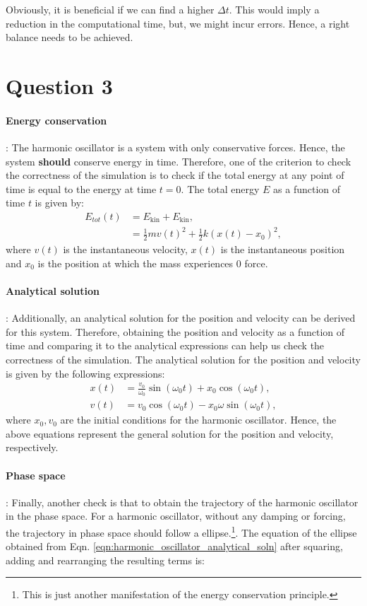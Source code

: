 \documentclass[10pt]{article}
\begin{document}
Obviously, it is beneficial if we can find a higher $\Delta t$. This would imply a reduction in the computational time, but, we might incur errors. Hence, a right balance needs to be achieved. 

\section*{Question 3}
\paragraph{Energy conservation}: The harmonic oscillator is a system with only conservative forces. Hence, the system \textbf{should} conserve energy in time. Therefore, one of the criterion to check the correctness of the simulation is to check if the total energy at any point of time is equal to the energy at time $t=0$. The total energy $E$ as a function of time $t$ is given by:
%
\begin{align*}
E_{tot}(t) &= E_{\mathrm{kin}} + E_{\mathrm{kin}},\\
           &= \frac{1}{2}mv(t)^2 + \frac{1}{2}k(x(t)-x_{0})^2,
\end{align*}
%
where $v(t)$ is the instantaneous velocity, $x(t)$ is the instantaneous position and $x_{0}$ is the position at which the mass experiences 0 force.
 
\paragraph{Analytical solution}: Additionally, an analytical solution for the position and velocity can be derived for this system. Therefore, obtaining the position and velocity as a function of time and comparing it to the analytical expressions can help us check the correctness of the simulation. The analytical solution for the position and velocity is given by the following expressions:
%
\begin{align}
x(t) &= \frac{v_{0}}{\omega_{0}}\sin(\omega_{0}t) + x_{0}\cos(\omega_{0}t),\\
v(t) &= v_{0}\cos(\omega_{0}t) - x_{0}\omega\sin(\omega_{0}t),
\label{eqn:harmonic_oscillator_analytical_soln}
\end{align} 
%
where $x_{0}, v_{0}$ are the initial conditions for the harmonic oscillator. Hence, the above equations represent the general solution for the position and velocity, respectively. 

\paragraph{Phase space}: Finally, another check is that to obtain the trajectory of the harmonic oscillator in the phase space. For a harmonic oscillator, without any damping or forcing, the trajectory in phase space should follow a ellipse.\footnote{ This is just another manifestation of the energy conservation principle.}. The equation of the ellipse obtained from Eqn. \eqref{eqn:harmonic_oscillator_analytical_soln} after squaring, adding and rearranging the resulting terms is:
\end{document}
